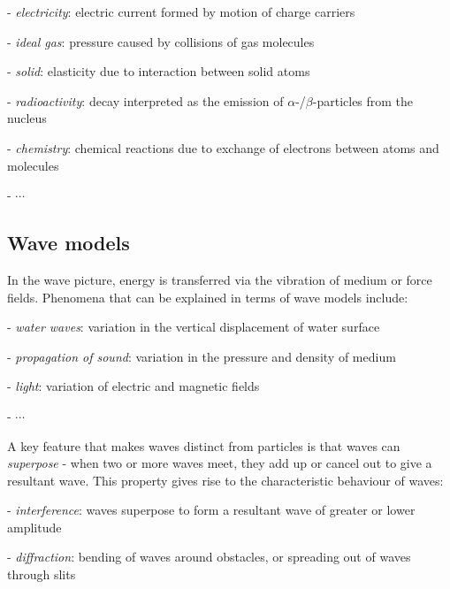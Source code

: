 \begin{compactenum}
	\item[-] \emph{electricity}: electric current formed by motion of charge carriers
	
	\item[-] \emph{ideal gas}: pressure caused by collisions of gas molecules
	
	\item[-] \emph{solid}: elasticity due to interaction between solid atoms
	
	\item[-] \emph{radioactivity}: decay interpreted as the emission of $\alpha$-/$\beta$-particles from the nucleus
	
	\item[-] \emph{chemistry}: chemical reactions due to exchange of electrons between atoms and molecules
	
	\item[-] $\cdots$
\end{compactenum}

\subsection{Wave models}

In the wave picture, energy is transferred via the vibration of medium or force fields. Phenomena that can be explained in terms of wave models include:

\begin{compactenum}
	\item[-] \emph{water waves}: variation in the vertical displacement of water surface
	
	\item[-] \emph{propagation of sound}: variation in the pressure and density of medium
	
	\item[-] \emph{light}: variation of electric and magnetic fields
	
	\item[-] $\cdots$
\end{compactenum}

A key feature that makes waves distinct from particles is that waves can \emph{superpose} - when two or more waves meet, they add up or cancel out to give a resultant wave. This property gives rise to the characteristic behaviour of waves:

\begin{compactenum}
	\item[-] \emph{interference}: waves superpose to form a resultant wave of greater or lower amplitude
	
	\item[-] \emph{diffraction}: bending of waves around obstacles, or spreading out of waves through slits
\end{compactenum}



